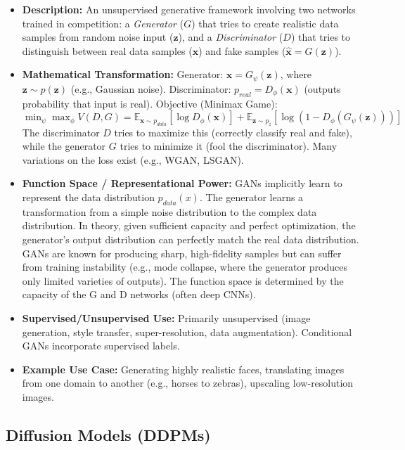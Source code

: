 \documentclass{article}
\newcommand{\bz}{\bm{z}}
\newcommand{\bx}{\bm{x}}
\begin{document}
\begin{itemize}
    \item \textbf{Description:} An unsupervised generative framework involving two networks trained in competition: a \emph{Generator} ($G$) that tries to create realistic data samples from random noise input ($\bz$), and a \emph{Discriminator} ($D$) that tries to distinguish between real data samples ($\bx$) and fake samples ($\hat{\bx} = G(\bz)$).
    \item \textbf{Mathematical Transformation:}
        Generator: $\hat{\bx} = G_{\psi}(\bz)$, where $\bz \sim p(\bz)$ (e.g., Gaussian noise).
        Discriminator: $p_{real} = D_{\phi}(\bx)$ (outputs probability that input is real).
        Objective (Minimax Game):
        $\min_{\psi} \max_{\phi} V(D, G) = \mathbb{E}_{\bx \sim p_{data}}[\log D_{\phi}(\bx)] + \mathbb{E}_{\bz \sim p_z}[\log(1 - D_{\phi}(G_{\psi}(\bz)))]$
        The discriminator $D$ tries to maximize this (correctly classify real and fake), while the generator $G$ tries to minimize it (fool the discriminator). Many variations on the loss exist (e.g., WGAN, LSGAN).
    \item \textbf{Function Space / Representational Power:} GANs implicitly learn to represent the data distribution $p_{data}(x)$. The generator learns a transformation from a simple noise distribution to the complex data distribution. In theory, given sufficient capacity and perfect optimization, the generator's output distribution can perfectly match the real data distribution. GANs are known for producing sharp, high-fidelity samples but can suffer from training instability (e.g., mode collapse, where the generator produces only limited varieties of outputs). The function space is determined by the capacity of the G and D networks (often deep CNNs).
    \item \textbf{Supervised/Unsupervised Use:} Primarily unsupervised (image generation, style transfer, super-resolution, data augmentation). Conditional GANs incorporate supervised labels.
    \item \textbf{Example Use Case:} Generating highly realistic faces, translating images from one domain to another (e.g., horses to zebras), upscaling low-resolution images.
\end{itemize}

\subsection{Diffusion Models (DDPMs)}
\end{document}
